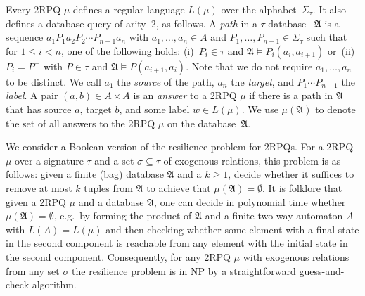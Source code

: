 \documentclass[nonacm]{acmart}
\newcommand{\bA}{{\mathfrak A}}
\begin{document}
Every 2RPQ $\mu$ defines a regular language $L(\mu)$ over the alphabet~$\Sigma_{\tau}$. It also defines a database query of arity~2, as
follows.  A \emph{path} in a $\tau$-database
~$\mathfrak{A}$ is a sequence
$a_1P_1a_2P_2 \cdots P_{n-1}a_n$ with $a_1,\dots,a_n \in A$ and
$P_1,\dots,P_{n-1} \in \Sigma_{\tau}$ such that for
$1 \leq i < n$, one of the following holds: (i)~$P_i \in \tau$ and
$\mathfrak{A} \models P_i(a_i,a_{i+1})$ or~(ii)~$P_i=P^-$ with $P \in \tau$ and $\mathfrak{A} \models P(a_{i+1},a_i)$.
Note that we do not require $a_1,\dots,a_n$ to be distinct.
We call $a_1$ the \emph{source} of the path, $a_n$ the \emph{target},
and $P_1 \cdots P_{n-1}$ the \emph{label}.
A pair
$(a,b) \in A\times A$ is an \emph{answer} to a 2RPQ
$\mu$ if there is a path in $\mathfrak{A}$ that has source $a$, target $b$, and
some label $w \in L(\mu)$. 
We use $\mu(\mathfrak{A})$ to denote the set of all
answers to the 2RPQ $\mu$ on the database~$\mathfrak{A}$.

We consider a Boolean version of the resilience problem for 2RPQs.
For a 2RPQ $\mu$ over a signature $\tau$ and a set $\sigma \subseteq \tau$ of
exogenous relations, this problem is as follows: given a finite (bag) database $\bA$ and a $k \geq 1$, decide whether it suffices to remove at most $k$
tuples from $\bA$ to achieve that $\mu(\bA)=\emptyset$. It is folklore that given a
2RPQ $\mu$ and a database $\bA$, one can decide in polynomial time whether $\mu(\bA)=\emptyset$, e.g.\ by forming the product of $\bA$ and a finite two-way automaton
$A$ with $L(A)=L(\mu)$ and then checking whether some element with a final state in the
second component is reachable from any element with the initial state in the second
component. Consequently, for any 2RPQ $\mu$ with exogenous relations from any set $\sigma$ the resilience
problem is in NP by
a straightforward guess-and-check algorithm.
\end{document}
